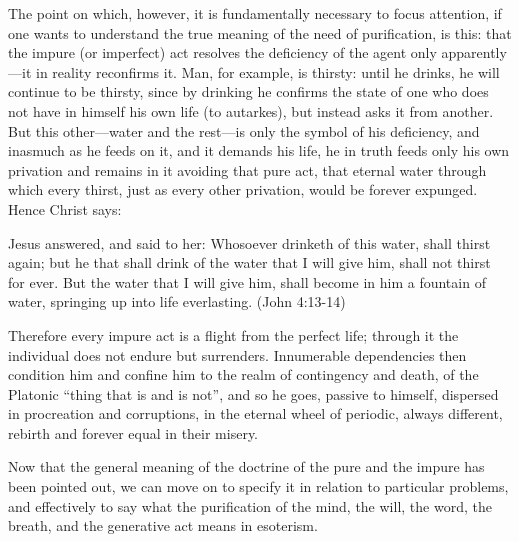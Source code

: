 The point on which, however, it is fundamentally necessary to focus attention, if one wants to understand the true meaning of the need of purification, is this: that the impure (or imperfect) act resolves the deficiency of the agent only apparently—it in reality reconfirms it. Man, for example, is thirsty: until he drinks, he will continue to be thirsty, since by drinking he confirms the state of one who does not have in himself his own life (to autarkes), but instead asks it from another. But this other—water and the rest—is only the symbol of his deficiency, and inasmuch as he feeds on it, and it demands his life, he in truth feeds only his own privation and remains in it avoiding that pure act, that eternal water through which every thirst, just as every other privation, would be forever expunged. Hence Christ says:

\begin{quotex}
Jesus answered, and said to her: Whosoever drinketh of this water, shall thirst again; but he that shall drink of the water that I will give him, shall not thirst for ever. But the water that I will give him, shall become in him a fountain of water, springing up into life everlasting. (John 4:13-14) 

\end{quotex}
Therefore every impure act is a flight from the perfect life; through it the individual does not endure but surrenders. Innumerable dependencies then condition him and confine him to the realm of contingency and death, of the Platonic “thing that is and is not”, and so he goes, passive to himself, dispersed in procreation and corruptions, in the eternal wheel of periodic, always different, rebirth and forever equal in their misery.

Now that the general meaning of the doctrine of the pure and the impure has been pointed out, we can move on to specify it in relation to particular problems, and effectively to say what the purification of the mind, the will, the word, the breath, and the generative act means in esoterism.



